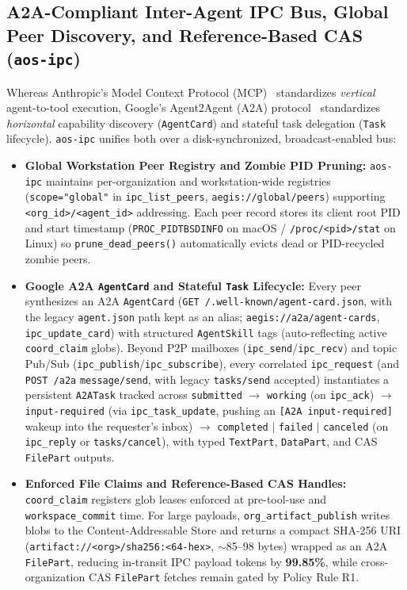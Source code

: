 \documentclass[acmsmall,screen,review]{acmart}
\begin{document}
\subsection{A2A-Compliant Inter-Agent IPC Bus, Global Peer Discovery, and Reference-Based CAS (\texttt{aos-ipc})}
\label{sec:ipc}

Whereas Anthropic's Model Context Protocol (MCP)~\cite{anthropic2024mcp} standardizes \emph{vertical} agent-to-tool execution, Google's Agent2Agent (A2A) protocol~\cite{google2025a2a} standardizes \emph{horizontal} capability discovery (\texttt{AgentCard}) and stateful task delegation (\texttt{Task} lifecycle). \texttt{aos-ipc} unifies both over a disk-synchronized, broadcast-enabled bus:
\begin{itemize}
    \item \textbf{Global Workstation Peer Registry and Zombie PID Pruning:} \texttt{aos-ipc} maintains per-organization and workstation-wide registries (\texttt{scope="global"} in \texttt{ipc\_list\_peers}, \texttt{aegis://global/peers}) supporting \texttt{<org\_id>/<agent\_id>} addressing. Each peer record stores its client root PID and start timestamp (\texttt{PROC\_PIDTBSDINFO} on macOS / \texttt{/proc/<pid>/stat} on Linux) so \texttt{prune\_dead\_peers()} automatically evicts dead or PID-recycled zombie peers.
    \item \textbf{Google A2A \texttt{AgentCard} and Stateful \texttt{Task} Lifecycle:} Every peer synthesizes an A2A \texttt{AgentCard} (\texttt{GET /.well-known/agent-card.json}, with the legacy \texttt{agent.json} path kept as an alias; \texttt{aegis://a2a/agent-cards}, \texttt{ipc\_update\_card}) with structured \texttt{AgentSkill} tags (auto-reflecting active \texttt{coord\_claim} globs). Beyond P2P mailboxes (\texttt{ipc\_send}/\texttt{ipc\_recv}) and topic Pub/Sub (\texttt{ipc\_publish}/\texttt{ipc\_subscribe}), every correlated \texttt{ipc\_request} (and \texttt{POST /a2a} \texttt{message/send}, with legacy \texttt{tasks/send} accepted) instantiates a persistent \texttt{A2ATask} tracked across \texttt{submitted} $\to$ \texttt{working} (on \texttt{ipc\_ack}) $\to$ \texttt{input-required} (via \texttt{ipc\_task\_update}, pushing an \texttt{[A2A input-required]} wakeup into the requester's inbox) $\to$ \texttt{completed} $\mid$ \texttt{failed} $\mid$ \texttt{canceled} (on \texttt{ipc\_reply} or \texttt{tasks/cancel}), with typed \texttt{TextPart}, \texttt{DataPart}, and CAS \texttt{FilePart} outputs.
    \item \textbf{Enforced File Claims and Reference-Based CAS Handles:} \texttt{coord\_claim} registers glob leases enforced at pre-tool-use and \texttt{workspace\_commit} time. For large payloads, \texttt{org\_artifact\_publish} writes blobs to the Content-Addressable Store and returns a compact SHA-256 URI (\texttt{artifact://<org>/sha256:<64-hex>}, $\sim$85--98 bytes) wrapped as an A2A \texttt{FilePart}, reducing in-transit IPC payload tokens by \textbf{99.85\%}, while cross-organization CAS \texttt{FilePart} fetches remain gated by Policy Rule R1.
\end{itemize}
\end{document}

